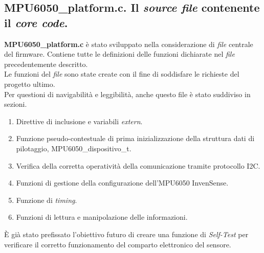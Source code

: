 \newpage

\newpage

\subsection{MPU6050\_platform.c. Il \textit{source file} contenente il \textit{core code}.}
\textbf{MPU6050\_platform.c} è stato sviluppato nella considerazione di \textit{file} centrale del firmware. Contiene tutte le definizioni delle funzioni dichiarate nel \textit{file} precedentemente descritto.\\
Le funzioni del \textit{file} sono state create con il fine di soddisfare le richieste del progetto ultimo.\\
Per questioni di navigabilità e leggibilità, anche questo file è stato suddiviso in sezioni.\\
\begin{enumerate}
    \item Direttive di inclusione e variabili \textit{extern}.
    \item Funzione pseudo-contestuale di prima inizializzazione della struttura dati di pilotaggio, MPU6050\_dispositivo\_t.
    \item Verifica della corretta operatività della comunicazione tramite protocollo I2C.
    \item Funzioni di gestione della configurazione dell'MPU6050 InvenSense.
    \item Funzione di \textit{timing}.
    \item Funzioni di lettura e manipolazione delle informazioni.  
\end{enumerate}
È già stato prefissato l'obiettivo futuro di creare una funzione di \textit{Self-Test} per verificare il corretto funzionamento del comparto elettronico del sensore.

